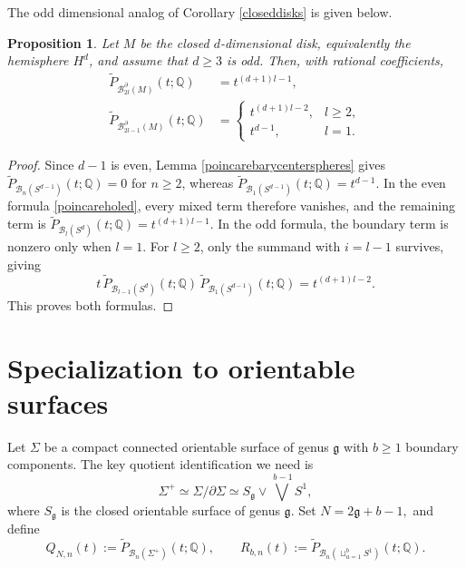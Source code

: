 \documentclass[11pt,a4paper]{article}
\numberwithin{equation}{section}
\newtheorem{prop}[thm]{Proposition}
\theoremstyle{definition}
\theoremstyle{remark}
\newcommand{\Q}{\mathbb{Q}}
\newcommand{\Si}{\Sigma}
\newcommand{\pa}{\partial}
\newcommand{\wt}{\widetilde}
\newcommand{\BB}{\mathcal B}
\newcommand{\mfg}{\mathfrak g}
\begin{document}
The odd dimensional analog of Corollary \ref{closeddisks} is given below.

\begin{prop}\label{odddimensionalcase}
    Let \(M\) be the closed \(d\)-dimensional disk, equivalently the
hemisphere \(H^d\), and assume that \(d\ge3\) is odd. Then, with rational
coefficients,
\begin{align*}
\widetilde P_{\BB_{2l}^{\partial}(M)}(t;\mathbb Q)
&=
t^{(d+1)l-1},
\\
\widetilde P_{\BB_{2l-1}^{\partial}(M)}(t;\mathbb Q)
&=
\begin{cases}
t^{(d+1)l-2}, & l\ge2,\\[1mm]
t^{d-1}, & l=1.
\end{cases}
\end{align*}
\end{prop}

\begin{proof}
Since \(d-1\) is even, Lemma \ref{poincarebarycenterspheres} gives
\(\wt P_{\BB_n(S^{d-1})}(t;\Q)=0\) for \(n\ge2\), whereas
\(\wt P_{\BB_1(S^{d-1})}(t;\Q)=t^{d-1}\). In the even formula
\eqref{poincareholed}, every mixed term therefore vanishes, and the remaining
term is \(\wt P_{\BB_l(S^d)}(t;\Q)=t^{(d+1)l-1}\). In the odd formula,
the boundary term is nonzero only when \(l=1\). For \(l\ge2\), only the
summand with \(i=l-1\) survives, giving
\[
t\,\wt P_{\BB_{l-1}(S^d)}(t;\Q)\,
\wt P_{\BB_1(S^{d-1})}(t;\Q)
=t^{(d+1)l-2}.
\]
This proves both formulas.
\end{proof}

 
\section{Specialization to orientable surfaces}
\label{sec:surface-specialization}

Let \(\Si\) be a compact connected orientable surface of genus
\(\mathfrak g\) with \(b\geq1\) boundary components. The key quotient
identification we need is
\[
\Si^+
\simeq
\Si/\pa\Si
\simeq
S_{\mfg}\vee\bigvee^{\,b-1}S^1,
\]
where \(S_{\mfg}\) is the closed orientable surface of genus
\(\mathfrak g\). Set
$
N=2\mathfrak g+b-1,
$
and define
\begin{equation}\label{eq:surface-Q-general}
Q_{N,n}(t)
:=
\wt P_{\BB_n(\Si^+)}(t;\Q),
\qquad
R_{b,n}(t)
:=
\wt P_{\BB_n(\sqcup_{a=1}^{b}S^1)}(t;\Q).
\end{equation}
\end{document}
